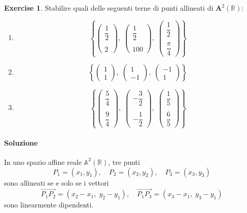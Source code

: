 \documentclass{article}
\theoremstyle{plain}
\theoremstyle{definition}
\newtheorem{xca}[exmp]{Exercise}
\theoremstyle{remark}
\begin{document}
\begin{bxthm}
\begin{xca}
    Stabilire quali delle seguenti terne di punti allineati di $\mathbf{A}^2(\mathbb{R})$: 
    \begin{enumerate}
        \item \[\left\{\begin{pmatrix}\dfrac{1}{2}\\\\2\end{pmatrix},\;\begin{pmatrix}\dfrac{1}{2}\\\\100\end{pmatrix},\;\begin{pmatrix}\dfrac{1}{2}\\\\\dfrac{\pi}{4}\end{pmatrix}\right\}\]
        \item \[\left\{\begin{pmatrix}1\\1\end{pmatrix},\;\begin{pmatrix}1\\-1\end{pmatrix},\;\begin{pmatrix}-1\\1\end{pmatrix}\right\}\]
        \item \[\left\{\begin{pmatrix}\dfrac{5}{4}\\\\\dfrac{9}{4}\end{pmatrix},\;\begin{pmatrix}-\dfrac{3}{2}\\\\-\dfrac{1}{2}\end{pmatrix},\;\begin{pmatrix}\dfrac{1}{5}\\\\\dfrac{6}{5}\end{pmatrix}\right\}\]
    \end{enumerate}
\end{xca}
\end{bxthm}
\paragraph{Soluzione}
In uno spazio affine reale $\mathbb{A}^2(\mathbb{R})$, tre punti
\[
P_1=(x_1,y_1),\quad P_2=(x_2,y_2),\quad P_3=(x_3,y_3)
\]
sono allineati se e solo se i vettori
\[
\overrightarrow{P_1P_2}=(x_2 - x_1,\;y_2 - y_1), 
\quad 
\overrightarrow{P_1P_3}=(x_3 - x_1,\;y_3 - y_1)
\]
sono linearmente dipendenti.  
\end{document}
